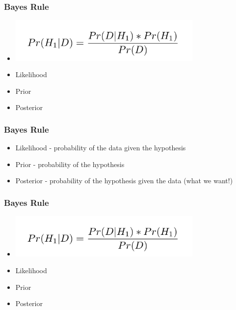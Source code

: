 \documentclass[14pt,handout]{beamer}
\begin{document}
\begin{frame}
\frametitle{Bayes Rule}
\begin{itemize}
\item[] 
	\begin{center}
	\includegraphics[width=0.75\textwidth]{images_20171130_bayes_final.png}
	\end{center}
	\item<+-> Likelihood
	\item<+-> Prior
	\item<+-> Posterior
\end{itemize}
\end{frame}

\begin{frame}
\frametitle{Bayes Rule}
\begin{itemize}
	\item<+-> Likelihood - probability of the data given the hypothesis
	\item<+-> Prior - probability of the hypothesis
	\item<+-> Posterior - probability of the hypothesis given the data (what we want!)
\end{itemize}
\end{frame}

\begin{frame}
\frametitle{Bayes Rule}
\begin{itemize}
\item[] 
	\begin{center}
	\includegraphics[width=0.75\textwidth]{images_20171130_bayes_final.png}
	\end{center}
	\item<+-> Likelihood
	\item<+-> Prior
	\item<+-> Posterior
\end{itemize}
\end{frame}
\end{document}
